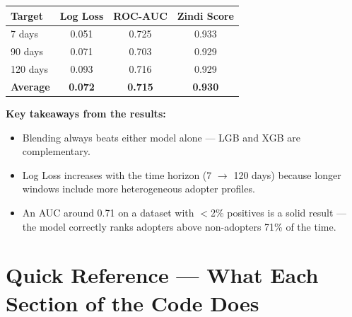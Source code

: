 \documentclass[11pt, a4paper]{article}
\begin{document}
\begin{center}
\begin{tabular}{lccc}
\toprule
\textbf{Target} & \textbf{Log Loss} & \textbf{ROC-AUC} & \textbf{Zindi Score} \\
\midrule
7 days   & 0.051 & 0.725 & 0.933 \\
90 days  & 0.071 & 0.703 & 0.929 \\
120 days & 0.093 & 0.716 & 0.929 \\
\midrule
\textbf{Average} & \textbf{0.072} & \textbf{0.715} & \textbf{0.930} \\
\bottomrule
\end{tabular}
\end{center}

\vspace{0.5em}
\begin{tcolorbox}[resultbox]
\textbf{Key takeaways from the results:}
\begin{itemize}[leftmargin=1em, itemsep=2pt]
  \item Blending always beats either model alone — LGB and XGB are complementary.
  \item Log Loss increases with the time horizon (7 $\to$ 120 days) because longer windows include more heterogeneous adopter profiles.
  \item An AUC around 0.71 on a dataset with $<$2\% positives is a solid result — the model correctly ranks adopters above non-adopters 71\% of the time.
\end{itemize}
\end{tcolorbox}

\section{Quick Reference — What Each Section of the Code Does}
\end{document}
